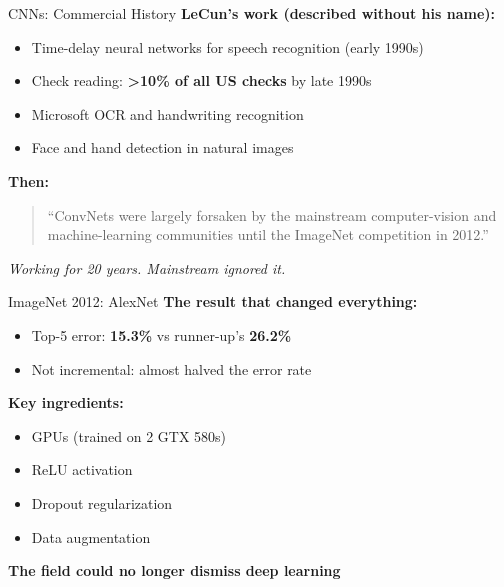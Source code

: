 \begin{frame}{CNNs: Commercial History}
    \textbf{LeCun's work (described without his name):}
    \begin{itemize}
        \item Time-delay neural networks for speech recognition (early 1990s)
        \item Check reading: \textbf{>10\% of all US checks} by late 1990s
        \item Microsoft OCR and handwriting recognition
        \item Face and hand detection in natural images
    \end{itemize}
    
    \vspace{1em}
    \textbf{Then:}
    \begin{quote}
        \small``ConvNets were largely forsaken by the mainstream computer-vision and machine-learning communities until the ImageNet competition in 2012.''
    \end{quote}
    
    \vspace{0.5em}
    \textit{Working for 20 years. Mainstream ignored it.}
\end{frame}

\begin{frame}{ImageNet 2012: AlexNet}
    \textbf{The result that changed everything:}
    
    \vspace{1em}
    \begin{itemize}
        \item Top-5 error: \textbf{15.3\%} vs runner-up's \textbf{26.2\%}
        \item Not incremental: almost halved the error rate
    \end{itemize}
    
    \vspace{1em}
    \textbf{Key ingredients:}
    \begin{itemize}
        \item GPUs (trained on 2 GTX 580s)
        \item ReLU activation
        \item Dropout regularization
        \item Data augmentation
    \end{itemize}
    
    \vspace{1em}
    \textbf{The field could no longer dismiss deep learning}
\end{frame}

